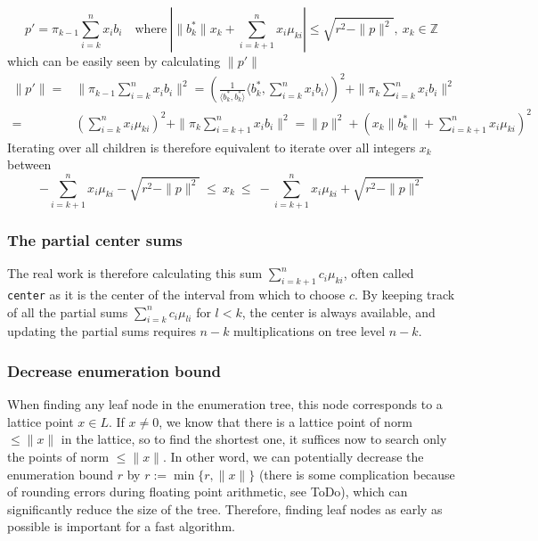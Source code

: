\documentclass{scrartcl}
\newcommand{\Z}{\mathbb{Z}}
\begin{document}
    \begin{equation*}
        p' = \pi_{k - 1}\sum_{i = k}^n x_i b_i \quad \text{where} \ \left|\|b_k^*\|x_k + \sum_{i = k + 1}^n x_i \mu_{ki} \right| \leq \sqrt{r^2 - \|p\|^2}, \ x_k \in \Z
    \end{equation*}
    which can be easily seen by calculating $\|p'\|$
    \begin{align*}
        \|p'\| = &\| \pi_{k - 1}\sum_{i = k}^n x_i b_i \|^2 = \left(\frac 1 {\langle b_k^*, b_k^* \rangle} \langle b_k^*, \sum_{i = k}^n x_i b_i \rangle \right)^2 + \| \pi_k \sum_{i = k}^n x_i b_i \|^2 \\
        = &\left( \sum_{i = k}^n x_i\mu_{ki} \right)^2 + \| \pi_k \sum_{i = k + 1}^n x_i b_i \|^2 = \| p \|^2 + \left( x_k\|b_k^*\| + \sum_{i = k + 1}^n x_i \mu_{ki} \right)^2
    \end{align*}
    Iterating over all children is therefore equivalent to iterate over all integers $x_k$ between
    \begin{equation*}
        -\sum_{i = k + 1}^n x_i \mu_{ki} - \sqrt{r^2 - \|p\|^2} \ \leq \ x_k \ \leq \ -\sum_{i = k + 1}^n x_i \mu_{ki} + \sqrt{r^2 - \|p\|^2}
    \end{equation*}

    \subsubsection{The partial center sums}

    \label{sec:center_partsums}
    The real work is therefore calculating this sum $\sum_{i = k + 1}^n c_i \mu_{ki}$, often called \texttt{center} as it is the center of the interval from which to choose $c$. By keeping track of all the partial sums $\sum_{i=k}^n c_i \mu_{li}$ for $l < k$, the center is always available, and updating the partial sums requires $n - k$ multiplications on tree level $n - k$.

    \subsubsection{Decrease enumeration bound}

    \label{sec:enum_bound}
    When finding any leaf node in the enumeration tree, this node corresponds to a lattice point $x \in L$. If $x \neq 0$, we know that there is a lattice point of norm $\leq \|x\|$ in the lattice, so to find the shortest one, it suffices now to search only the points of norm $\leq \|x\|$. In other word, we can potentially decrease the enumeration bound $r$ by $r := \min \{ r, \|x\| \}$ (there is some complication because of rounding errors during floating point arithmetic, see ToDo), which can significantly reduce the size of the tree. Therefore, finding leaf nodes as early as possible is important for a fast algorithm.
\end{document}
